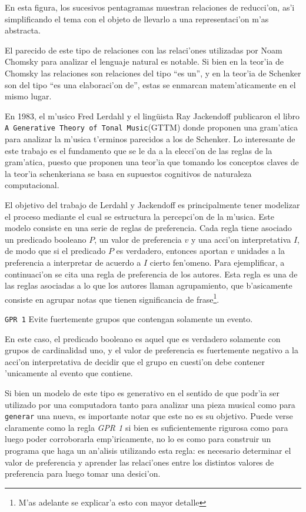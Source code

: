 En esta figura, los sucesivos pentagramas muestran relaciones de reducci'on, as'i simplificando el tema con el objeto de llevarlo a una representaci'on m'as abstracta.

El parecido de este tipo de relaciones con las relaci'ones utilizadas por Noam Chomsky para analizar el lenguaje natural es notable. 
Si bien en la teor'ia de Chomsky las relaciones son relaciones del tipo ``es un'', y en la teor'ia de Schenker son del tipo ``es una elaboraci'on de'', 
estas se enmarcan matem'aticamente en el mismo lugar.  

En 1983, el m'usico Fred Lerdahl y el ling\"uista Ray Jackendoff publicaron el libro 
\texttt{A Generative Theory of Tonal Music}(GTTM) donde proponen una gram'atica para analizar la m'usica t'erminos parecidos a los de Schenker. 
Lo interesante de este trabajo es el fundamento que se le da a la elecci'on de las reglas de la gram'atica, puesto que proponen una teor'ia que tomando los conceptos claves
de la teor'ia schenkeriana se basa en supuestos cognitivos de naturaleza computacional.

El objetivo del trabajo de Lerdahl y Jackendoff es principalmente tener modelizar el proceso mediante el cual se estructura la percepci'on de la m'usica. 
Este modelo consiste en una serie de reglas de preferencia. Cada regla tiene asociado un predicado booleano $P$, un valor de preferencia $v$ y una acci'on interpretativa 
$I$, de modo que si el predicado $P$ es verdadero, entonces aportan $v$ unidades a la preferencia a interpretar de acuerdo a $I$ cierto fen'omeno. 
Para ejemplificar, a continuaci'on se cita una regla de preferencia de los autores. Esta regla es una de las reglas asociadas a lo que los autores 
llaman agrupamiento, que b'asicamente consiste en agrupar notas que tienen significancia de frase\footnote{M'as adelante se explicar'a esto con mayor detalle}.
\newline

\begin{center}
\texttt{GPR 1} Evite fuertemente grupos que contengan solamente un evento.
\end{center}

En este caso, el predicado booleano es aquel que es verdadero solamente con grupos de cardinalidad uno, y el valor de preferencia es fuertemente negativo a la acci'on interpretativa
de decidir que el grupo en cuesti'on debe contener 'unicamente al evento que contiene. 

Si bien un modelo de este tipo es generativo en el sentido de que podr'ia ser utilizado por una computadora tanto para analizar una pieza musical como para 
\texttt{generar} una nueva, es importante notar que este no es su objetivo. 
Puede verse claramente como la regla \emph{GPR 1} si bien es suficientemente rigurosa como para luego poder corroborarla emp'iricamente, no lo es como para construir un 
programa que haga un an'alisis utilizando esta regla: es necesario determinar el valor de preferencia y aprender las relaci'ones entre los distintos valores de preferencia para luego 
tomar una desici'on.  

